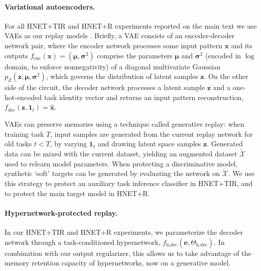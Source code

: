 \documentclass{article}
\begin{document}
\paragraph{Variational autoencoders.} For all HNET+TIR and HNET+R experiments reported on the main text we use VAEs as our replay models \citep[Fig.~\ref{fig:replay-setups}a,][]{kingma_auto-encoding_2014}. Briefly, a VAE consists of an encoder-decoder network pair, where the encoder network processes some input pattern $\mathbf{x}$ and its outputs $f_\text{enc}(\mathbf{x}) = (\boldsymbol\mu, \boldsymbol\sigma^2)$ comprise the parameters $\boldsymbol\mu$ and $\boldsymbol\sigma^2$ (encoded in $\log$ domain, to enforce nonnegativity) of a diagonal multivariate Gaussian $p_Z(\mathbf{z}; \boldsymbol\mu, \boldsymbol\sigma^2)$, which governs the distribution of latent samples $\mathbf{z}$. On the other side of the circuit, the decoder network processes a latent sample $\mathbf{z}$ and a one-hot-encoded task identity vector and returns an input pattern reconstruction, $f_\text{dec}(\mathbf{z}, \mathbf{1}_t) = \hat{\mathbf{x}}$.

VAEs can preserve memories using a technique called generative replay: when training task $T$, input samples are generated from the current replay network for old tasks $t < T$, by varying  $\mathbf{1}_t$ and drawing latent space samples $\mathbf{z}$. Generated data can be mixed with the current dataset, yielding an augmented dataset $\tilde{\mathcal{X}}$ used to relearn model parameters. When protecting a discriminative model, synthetic `soft' targets can be generated by evaluating the network on $\tilde{\mathcal{X}}$. We use this strategy to protect an auxiliary task inference classifier in HNET+TIR, and to protect the main target model in HNET+R.

\paragraph{Hypernetwork-protected replay.} In our HNET+TIR and HNET+R experiments, we parameterize the decoder network through a task-conditioned hypernetwork, $f_\text{h,dec}(\mathbf{e}, \Theta_\text{h,dec})$. In combination with our output regularizer, this allows us to take advantage of the memory retention capacity of hypernetworks, now on a generative model.
\end{document}
